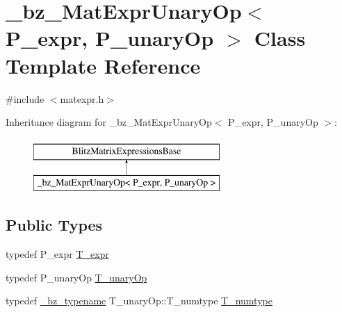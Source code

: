 \hypertarget{class__bz__MatExprUnaryOp}{}\section{\+\_\+bz\+\_\+\+Mat\+Expr\+Unary\+Op$<$ P\+\_\+expr, P\+\_\+unary\+Op $>$ Class Template Reference}
\label{class__bz__MatExprUnaryOp}


{\ttfamily \#include $<$matexpr.\+h$>$}

Inheritance diagram for \+\_\+bz\+\_\+\+Mat\+Expr\+Unary\+Op$<$ P\+\_\+expr, P\+\_\+unary\+Op $>$\+:\begin{figure}[H]
\begin{center}
\leavevmode
\includegraphics[height=2.000000cm]{class__bz__MatExprUnaryOp}
\end{center}
\end{figure}
\subsection*{Public Types}
\begin{DoxyCompactItemize}
\item 
typedef P\+\_\+expr \hyperlink{class__bz__MatExprUnaryOp_a65c601c6f2db6a86a98c6e97f3622276}{T\+\_\+expr}
\item 
typedef P\+\_\+unary\+Op \hyperlink{class__bz__MatExprUnaryOp_a134a6abbbf3d96c2bf4dcfdcec86d3ac}{T\+\_\+unary\+Op}
\item 
typedef \hyperlink{compiler_8h_a1bc40add3e72effc9cf69dbe445cbdfd}{\+\_\+bz\+\_\+typename} T\+\_\+unary\+Op\+::\+T\+\_\+numtype \hyperlink{class__bz__MatExprUnaryOp_aa1693d8e8ebc8e222d658d83b15e943c}{T\+\_\+numtype}
\end{DoxyCompactItemize}
